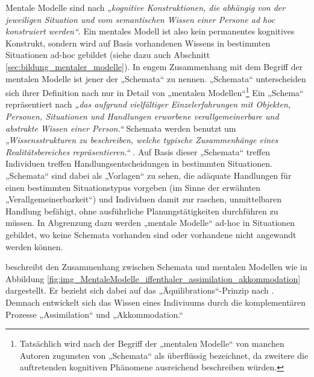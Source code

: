 Mentale Modelle sind nach \citet[][S. 7]{Ifenthaler06} \emph{„kognitive Konstruktionen, die abhängig von der jeweiligen Situation und vom semantischen Wissen einer Persone ad hoc konstruiert werden“}. Ein mentales Modell ist also kein permanentes kognitives Konstrukt, sondern wird auf Basis vorhandenen Wissens in bestimmten Situationen ad-hoc gebildet (siehe dazu auch Abschnitt \ref{sec:bildung_mentaler_modelle}). In engem Zusammenhang mit dem Begriff der mentalen Modelle ist jener der „Schemata“ zu nennen. „Schemata“ unterscheiden sich ihrer Definition nach nur in Detail von „mentalen Modellen“\footnote{Tatsächlich wird nach \citet{Ifenthaler06} der Begriff der „mentalen Modelle“ von manchen Autoren zugunsten von „Schemata“ als überflüssig bezeichnet, da zweitere die auftretenden kognitiven Phänomene ausreichend beschreiben würden.} Ein „Schema“ repräsentiert nach \citet[][S. 57]{Seel03a} \emph{„das aufgrund vielfältiger Einzelerfahrungen mit Objekten, Personen, Situationen und Handlungen erworbene verallgemeinerbare und abstrakte Wissen einer Person.“} Schemata werden benutzt um \emph{„Wissensstrukturen zu beschreiben, welche typische Zusammenhänge eines Realitätsbereiches repräsentieren.“} \citep[][S. 8]{Ifenthaler06}. Auf Basis dieser „Schemata“ treffen Individuen treffen Handlungsentscheidungen in bestimmten Situationen. „Schemata“ sind dabei als „Vorlagen“ zu sehen, die adäquate Handlungen für einen bestimmten Situationstypus vorgeben (im Sinne der erwähnten „Verallgemeinerbarkeit“) und Individuen damit zur raschen, unmittelbaren Handlung befähigt, ohne ausführliche Planungstätigkeiten durchführen zu müssen. In Abgrenzung dazu werden „mentale Modelle“ ad-hoc in Situationen gebildet, wo keine Schemata vorhanden sind oder vorhandene nicht angewandt werden können. 

\citet{Ifenthaler06} beschreibt den Zusammenhang zwischen Schemata und mentalen Modellen wie in Abbildung \ref{fig:img_MentaleModelle_iffenthaler_assimilation_akkommodation} dargestellt. Er bezieht sich dabei auf das „Äquilibrations“-Prinzip nach \citet{Piaget76}. Demnach entwickelt sich das Wissen eines Indiviuums durch die komplementären Prozesse „Assimilation“ und „Akkommodation.“

